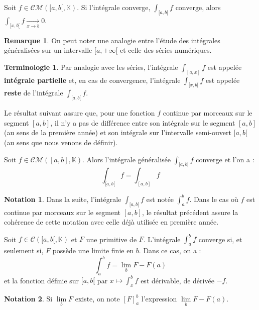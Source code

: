 \documentclass[french]{article}
\newcommand{\K}{\mathbb{K}}
\theoremstyle{plain}
\theoremstyle{definition}
\newtheorem*{rmq}{Remarque}
\newtheorem*{notation}{Notation}
\newtheorem*{terminologie}{Terminologie}
\theoremstyle{remark}
\begin{document}
\begin{cor}%
	Soit $f\in\mathcal{CM}([a,b[,\K)$. Si l'intégrale converge, $\displaystyle\int_{[a,b[}f$ converge, alors $\displaystyle\int_{[x,b[}f\xrightarrow[x\to b]{}0$.
\end{cor}

\begin{rmq}
	On peut noter une analogie entre l'étude des intégrales généralisées sur un intervalle $[a,+\infty[$ et celle des séries numériques.
\end{rmq}

\begin{terminologie}
	Par analogie avec les séries, l'intégrale $\displaystyle\int_{[a,x]}f$ est appelée \textbf{intégrale partielle} et, en cas de convergence, l'intégrale $\displaystyle\int_{[x,b[}f$ est appelée \textbf{reste} de l'intégrale $\displaystyle\int_{[a,b[}f$.
\end{terminologie}


Le résultat suivant assure que, pour une fonction $f$ continue par morceaux sur le segment $[a,b]$, il n'y a pas de différence entre son intégrale sur le segment $[a,b]$ (au sens de la première année) et son intégrale sur l'intervalle semi-ouvert $[a,b[$ (au sens que nous venons de définir).

\begin{prop}%
	Soit $f\in\mathcal{CM}([a,b],\K)$. Alors l'intégrale généralisée $\displaystyle\int_{[a,b[}f$ converge et l'on a :
	$$\int_{[a,b[}f=\int_{[a,b]}f$$
\end{prop}

\begin{notation}
	Dans la suite, l'intégrale $\displaystyle\int_{[a,b[}f$ est notée $\displaystyle\int_{a}^{b}f$. Dans le cas où $f$ est continue par morceaux sur le segment $[a,b]$, le résultat précédent assure la cohérence de cette notation avec celle déjà utilisée en première année.
\end{notation}

\begin{prop}%
	Soit $f\in\mathcal{C}([a,b[,\K)$ et $F$ une primitive de $F$. L'intégrale $\displaystyle\int_{a}^{b}f$ converge si, et seulement si, $F$ possède une limite finie en $b$. Dans ce cas, on a : 
	$$\int_{a}^{b}f=\underset{b}{\lim}F-F(a)$$ et la fonction définie sur $[a,b[$ par $x\mapsto\displaystyle\int_{x}^{b}f$ est dérivable, de dérivée $-f$.
\end{prop}

\begin{notation}
	Si $\underset{b}{\lim}F$ existe, on note $[F]_a^b$ l'expression $\underset{b}{\lim}F-F(a)$.
\end{notation}
\end{document}
